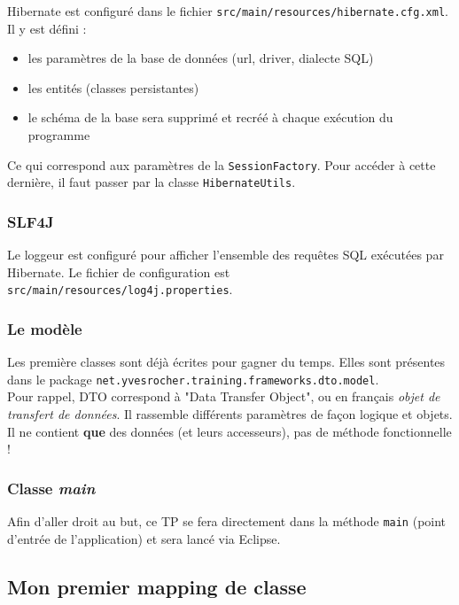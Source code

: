\documentclass[small,algo]{dushClass}
\begin{document}
Hibernate est configuré dans le fichier \texttt{src/main/resources/hibernate.cfg.xml}. Il y est défini :
\begin{itemize}
\item les paramètres de la base de données (url, driver, dialecte SQL)
\item les entités (classes persistantes)
\item le schéma de la base sera supprimé et recréé à chaque exécution du programme\\
\end{itemize}

Ce qui correspond aux paramètres de la \texttt{SessionFactory}. Pour accéder à cette dernière, il faut passer par la classe \texttt{HibernateUtils}.

\subsubsection{SLF4J}
Le loggeur est configuré pour afficher l'ensemble des requêtes SQL exécutées par Hibernate. Le fichier de configuration est \texttt{src/main/resources/log4j.properties}.

\subsubsection{Le modèle}

Les première classes sont déjà écrites pour gagner du temps. Elles sont présentes dans le package \texttt{net.yvesrocher.training.frameworks.dto.model}.\\

Pour rappel, DTO correspond à "Data Transfer Object", ou en français \emph{objet de transfert de données}. Il rassemble différents paramètres de façon logique et objets. Il ne contient \textbf{que} des données (et leurs accesseurs), pas de méthode fonctionnelle !

\subsubsection{Classe \emph{main}}

Afin d'aller droit au but, ce TP se fera directement dans la méthode \texttt{main} (point d'entrée de l'application) et sera lancé via Eclipse.


\subsection{Mon premier mapping de classe}
\end{document}
